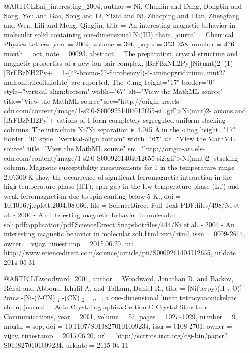 @ARTICLE{ni_interesting_2004,
  author = {Ni, Chunlin and Dang, Dongbin and Song, You and Gao, Song and Li,
	Yizhi and Ni, Zhaoping and Tian, Zhengfang and Wen, Lili and Meng,
	Qingjin},
  title = {An interesting magnetic behavior in molecular solid containing one-dimensional
	{Ni}({III}) chain},
  journal = {Chemical Physics Letters},
  year = {2004},
  volume = {396},
  pages = {353--358},
  number = {4?6},
  month = oct,
  note = {00093},
  abstract = {The preparation, crystal structure and magnetic properties of a new
	ion-pair complex, [BrFBzNH2Py][Ni(mnt)2] (1) [BrFBzNH2Py+ = 1-(4?-bromo-2?-flurobenzyl)-4-aminopyridinium,
	mnt2? = maleonitriledithiolate] are reported. The {\textless}img
	height="17" border="0" style="vertical-align:bottom" width="67" alt="View
	the MathML source" title="View the MathML source" src="http://origin-ars.els-cdn.com/content/image/1-s2.0-S0009261404012655-si1.gif"{\textgreater}Ni(mnt)2-
	anions and [BrFBzNH2Py]+ cations of 1 form completely segregated
	uniform stacking columns. The intrachain Ni?Ni separation is 4.045
	Å in the {\textless}img height="17" border="0" style="vertical-align:bottom"
	width="67" alt="View the MathML source" title="View the MathML source"
	src="http://origin-ars.els-cdn.com/content/image/1-s2.0-S0009261404012655-si2.gif"{\textgreater}Ni(mnt)2-
	stacking column. Magnetic susceptibility measurements for 1 in the
	temperature range 2.0?300 K show the occurrence of significant ferromagnetic
	interaction in the high-temperature phase (HT), spin gap in the low-temperature
	phase (LT) and weak ferromagnetism due to spin canting below 5 K.},
  doi = {10.1016/j.cplett.2004.08.060},
  file = {ScienceDirect Full Text PDF:files/498/Ni et al. - 2004 - An interesting magnetic behavior in molecular soli.pdf:application/pdf;ScienceDirect Snapshot:files/444/Ni et al. - 2004 - An interesting magnetic behavior in molecular soli.html:text/html},
  issn = {0009-2614},
  owner = {vijay},
  timestamp = {2015.06.20},
  url = {http://www.sciencedirect.com/science/article/pii/S0009261404012655},
  urldate = {2014-05-31}
}

@ARTICLE{woodward_2001,
  author = {Woodward, Jonathan D. and Backov, Rénal and Abboud, Khalil A. and
	Talham, Daniel R.},
  title = {[{Ni}(terpy)({H} $_{\textrm{2}}$ {O})]- \textit{trans} -[{Ni}-(?-{CN})
	$_{\textrm{2}}$ -({CN}) $_{\textrm{2}}$ ] $_{\textrm{ \textit{n}
	}}$ , a one-dimensional linear tetracyanonickelate chain},
  journal = {Acta Crystallographica Section C Crystal Structure Communications},
  year = {2001},
  volume = {57},
  pages = {1027--1029},
  number = {9},
  month = sep,
  doi = {10.1107/S0108270101009234},
  issn = {0108-2701},
  owner = {vijay},
  timestamp = {2015.06.20},
  url = {http://scripts.iucr.org/cgi-bin/paper?S0108270101009234},
  urldate = {2015-04-11}
}

